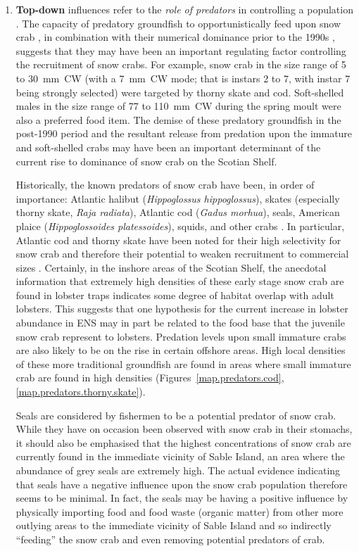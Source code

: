 \documentclass[11pt]{article}
\begin{document}
\begin{enumerate}
  \item \textbf{Top-down} influences refer to the \emph{role of predators} in controlling a population \citep{PaineRT1966, Tremblay1997, Worm2003}. The capacity of predatory groundfish to opportunistically feed upon snow crab \citep{Robichaud1991}, in combination with their numerical dominance prior to the 1990s \citep{Choi2004, Choi2005, FrankKT2005}, suggests that they may have been an important regulating factor controlling the recruitment of snow crabs. For example, snow crab in the size range of 5 to 30~mm~CW (with a 7~mm~CW mode; that is instars 2 to 7, with instar 7 being strongly selected) were targeted by thorny skate and cod. Soft-shelled males in the size range of 77 to 110~mm~CW during the spring moult were also a preferred food item. The demise of these predatory groundfish in the post-1990 period and the resultant release from predation upon the immature and soft-shelled crabs may have been an important determinant of the current rise to dominance of snow crab on the Scotian Shelf.

    Historically, the known predators of snow crab have been, in order of importance: Atlantic halibut (\textit{Hippoglossus hippoglossus}), skates (especially thorny skate, \textit{Raja radiata}), Atlantic cod (\textit{Gadus morhua}), seals, American plaice (\textit{Hippoglossoides platessoides}), squids, and other crabs \citep{Bundy2004}. In particular, Atlantic cod and thorny skate have been noted for their high selectivity for snow crab and therefore their potential to weaken recruitment to commercial sizes \citep{Bailey1982, Lilly1984, Robichaud1989, Robichaud1991}. Certainly, in the inshore areas of the Scotian Shelf, the anecdotal information that extremely high densities of these early stage snow crab are found in lobster traps indicates some degree of habitat overlap with adult lobsters. This suggests that one hypothesis for the current increase in lobster abundance in ENS may in part be related to the food base that the juvenile snow crab represent to lobsters. Predation levels upon small immature crabs are also likely to be on the rise in certain offshore areas. High local densities of these more traditional groundfish are found in areas where small immature crab are found in high densities (Figures~\ref{map.predators.cod}, \ref{map.predators.thorny.skate}). 

Seals are considered by fishermen to be a potential predator of snow crab. While they have on occasion been observed with snow crab in their stomachs, it should also be emphasised that the highest concentrations of snow crab are currently found in the immediate vicinity of Sable Island, an area where the abundance of grey seals are extremely high. The actual evidence indicating that seals have a negative influence upon the snow crab population therefore seems to be minimal. In fact, the seals may be having a positive influence by physically importing food and food waste (organic matter) from other more outlying areas to the immediate vicinity of Sable Island and so indirectly ``feeding'' the snow crab and even removing potential predators of crab.



\end{enumerate}
\end{document}
